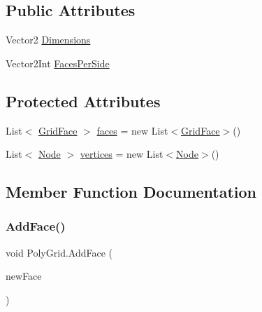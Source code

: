 \subsection*{Public Attributes}
\begin{DoxyCompactItemize}
\item 
Vector2 \mbox{\hyperlink{class_poly_grid_aeebd9e2f028fa1d79b48a61cf65a6829}{Dimensions}}
\item 
Vector2\+Int \mbox{\hyperlink{class_poly_grid_aa3d72d505c3c008a5bd52a448d932840}{Faces\+Per\+Side}}
\end{DoxyCompactItemize}
\subsection*{Protected Attributes}
\begin{DoxyCompactItemize}
\item 
List$<$ \mbox{\hyperlink{class_grid_face}{Grid\+Face}} $>$ \mbox{\hyperlink{class_poly_grid_ad1f5acf9cfbd3a2ad7add30d87eb0416}{faces}} = new List$<$\mbox{\hyperlink{class_grid_face}{Grid\+Face}}$>$()
\item 
List$<$ \mbox{\hyperlink{class_node}{Node}} $>$ \mbox{\hyperlink{class_poly_grid_a40f18bd5bd749337828beb314e43a36e}{vertices}} = new List$<$\mbox{\hyperlink{class_node}{Node}}$>$()
\end{DoxyCompactItemize}


\subsection{Member Function Documentation}
\mbox{\label{class_poly_grid_a0fc1f57b2840e01acfc2d7dbe49d2fd1}} 
\subsubsection{\texorpdfstring{Add\+Face()}{AddFace()}}
{\footnotesize\ttfamily void Poly\+Grid.\+Add\+Face (\begin{DoxyParamCaption}\item[{\mbox{\hyperlink{class_grid_face}{Grid\+Face}}}]{new\+Face }\end{DoxyParamCaption})}

\mbox{\label{class_poly_grid_a486c7e7a5829e4bb9966c064db28113d}} 
